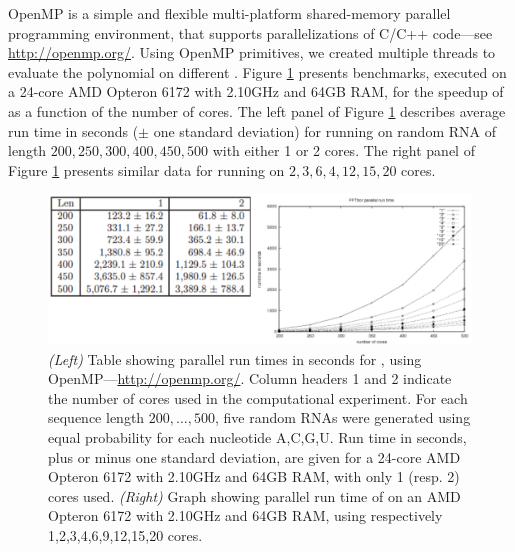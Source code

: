 OpenMP is a simple and flexible
multi-platform shared-memory parallel programming environment, that supports
parallelizations of C/C++ code---see \url{http://openmp.org/}.
Using OpenMP primitives, we created multiple threads to evaluate the polynomial
\fullZx on different \nRoUs. Figure \ref{fig:fftbor:benchmarkingParallel}
presents benchmarks, executed on
a 24-core AMD Opteron 6172 with 2.10GHz and 64GB RAM, for the speedup
of \fftbor as a function of the number of cores.
The left panel of Figure \ref{fig:fftbor:benchmarkingParallel} describes average
run time in seconds ($\pm$ one standard deviation) for running \fftbor
on random RNA of length $200,250,300,400,450,500$ with either 1 or 2 cores.
The right panel of Figure \ref{fig:fftbor:benchmarkingParallel}
presents similar data for running
\fftbor on $2,3,6,4,12,15,20$ cores.

\begin{figure}[!ht]
\centering
\includegraphics[width=.9\textwidth]{Figures/FFTbor/benchmarkingOpenMP.pdf}
\caption{{\em (Left)} Table showing parallel run times in seconds
for \fftbor, using
OpenMP---\url{http://openmp.org/}. Column headers 1 and 2 indicate
the number of cores used in the computational experiment.
For each sequence length $200,\dots,500$,
five random RNAs were generated using equal probability for each nucleotide
A,C,G,U. Run time in seconds, plus or minus one standard deviation, are
given for a 24-core
AMD Opteron 6172 with 2.10GHz and 64GB RAM, with only 1 (resp. 2) cores
used.
{\em (Right)} Graph showing parallel run time of \fftbor on
an AMD Opteron 6172 with 2.10GHz and 64GB RAM, using respectively
1,2,3,4,6,9,12,15,20 cores.
}
\label{fig:fftbor:benchmarkingParallel}
\end{figure}
